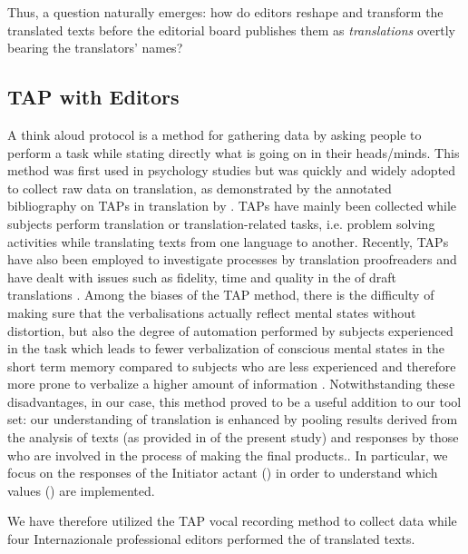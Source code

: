 \documentclass[output=paper]{LSP/langsci}
\begin{document}
Thus, a question naturally emerges: how do editors reshape and transform the translated texts before the editorial board publishes them as \textit{translations} overtly bearing the translators' %
names?

\subsection{TAP with Editors}\label{troqe-marchan:sec:b}

A think aloud protocol is a method for gathering data by asking people to perform a task while stating directly what is going on in their heads/minds. This method was first used in psychology studies \citep{Ericsson1993} but was quickly and widely adopted to collect raw data on translation, as demonstrated by the annotated bibliography on TAPs in translation by \citet{Jaaskelainen2002}. TAPs have mainly been collected while subjects perform translation or translation{}-related tasks, i.e. problem solving activities while translating texts from one language to another. Recently, TAPs have also been employed to investigate processes by translation proofreaders and have dealt with issues such as fidelity, time and quality in the  of draft translations \citep{Kunzli2007, Robert2013}. %
Among the biases of the TAP method, there is the difficulty of making sure that the verbalisations actually reflect mental states without distortion, but also the degree of automation performed by subjects experienced in the task which leads to fewer verbalization of conscious mental states in the short term memory compared to subjects who are less experienced and therefore more prone to verbalize a higher amount of information \citep[127]{Ericsson1993}. Notwithstanding these disadvantages, in our case, this method proved to be a useful addition to our tool set: our understanding of translation is enhanced by pooling results derived from the analysis of texts (as provided in  of the present study) and responses by those who are involved in the process of making the final products.. In particular, we focus on the responses of the Initiator actant () in order to understand which values () are implemented. 

We have therefore utilized the TAP vocal recording method to collect data while four Internazionale professional editors performed the  of translated texts. 
\end{document}
